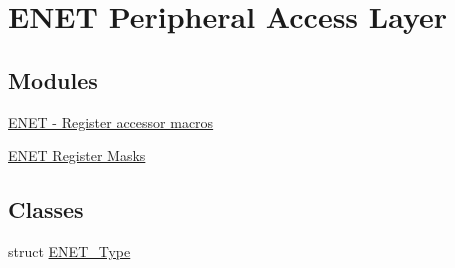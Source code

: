 \hypertarget{group__ENET__Peripheral__Access__Layer}{}\section{E\+N\+ET Peripheral Access Layer}
\label{group__ENET__Peripheral__Access__Layer}
\subsection*{Modules}
\begin{DoxyCompactItemize}
\item 
\hyperlink{group__ENET__Register__Accessor__Macros}{E\+N\+E\+T -\/ Register accessor macros}
\item 
\hyperlink{group__ENET__Register__Masks}{E\+N\+E\+T Register Masks}
\end{DoxyCompactItemize}
\subsection*{Classes}
\begin{DoxyCompactItemize}
\item 
struct \hyperlink{structENET__Type}{E\+N\+E\+T\+\_\+\+Type}
\end{DoxyCompactItemize}
